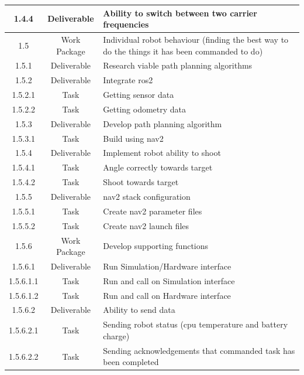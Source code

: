 \begin{longtable}{|c|c|m{}|}
    \rowcolor{c1-d} 1.4.4 & Deliverable & Ability to switch between two carrier frequencies \\ \hline
    \rowcolor{c1-wp} 1.5 & Work Package & Individual robot behaviour (finding the best way to do the things it has been commanded to do) \\ \hline
    \rowcolor{c1-d} 1.5.1 & Deliverable & Research viable path planning algorithms \\ \hline
    \rowcolor{c1-d} 1.5.2 & Deliverable & Integrate \acs{ros2} \\ \hline
    \rowcolor{c1-t} 1.5.2.1 & Task & Getting sensor data \\ \hline
    \rowcolor{c1-t} 1.5.2.2 & Task & Getting odometry data \\ \hline
    \rowcolor{c1-d} 1.5.3 & Deliverable & Develop path planning algorithm \\ \hline
    \rowcolor{c1-t} 1.5.3.1 & Task & Build using nav2 \\ \hline
    \rowcolor{c1-d} 1.5.4 & Deliverable & Implement robot ability to shoot \\ \hline
    \rowcolor{c1-t} 1.5.4.1 & Task & Angle correctly towards target \\ \hline
    \rowcolor{c1-t} 1.5.4.2 & Task & Shoot towards target \\ \hline
    \rowcolor{c1-d} 1.5.5 & Deliverable & nav2 stack configuration \\ \hline
    \rowcolor{c1-t} 1.5.5.1 & Task & Create nav2 parameter files \\ \hline
    \rowcolor{c1-t} 1.5.5.2 & Task & Create nav2 launch files \\ \hline
    \rowcolor{c1-wp} 1.5.6 & Work Package & Develop supporting functions \\ \hline
    \rowcolor{c1-d} 1.5.6.1 & Deliverable & Run Simulation/Hardware interface \\ \hline
    \rowcolor{c1-t} 1.5.6.1.1 & Task & Run and call on Simulation interface \\ \hline
    \rowcolor{c1-t} 1.5.6.1.2 & Task & Run and call on Hardware interface \\ \hline
    \rowcolor{c1-d} 1.5.6.2 & Deliverable & Ability to send data \\ \hline
    \rowcolor{c1-t} 1.5.6.2.1 & Task & Sending robot status (\acs{cpu} temperature and battery charge) \\ \hline
    \rowcolor{c1-t} 1.5.6.2.2 & Task & Sending acknowledgements that commanded task has been completed \\ \hline

\end{longtable}
